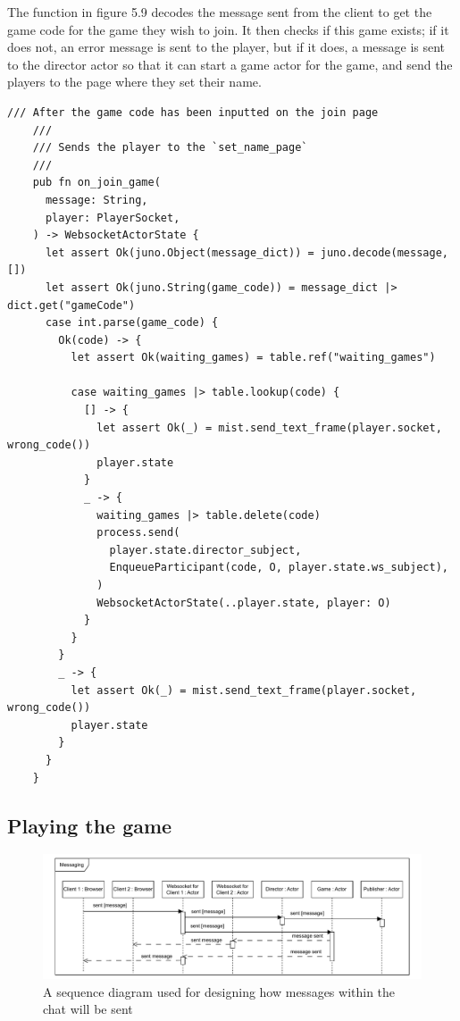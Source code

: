 \documentclass[]{final}
\begin{document}
\newpage

\begin{minipage}[t]{18em}
  The function in figure 5.9 decodes the message sent from the client to
  get the game code for the game they wish to join. It then checks if this game
  exists; if it does not, an error message is sent to the player, but if it does,
  a message is sent to the director actor so that it can start a game actor for the game,
  and send the players to the page where they set their name.
\end{minipage}
\hfill
\begin{minipage}[t]{20em}
  \begin{lstlisting}[language=gleam]
    /// After the game code has been inputted on the join page
    ///
    /// Sends the player to the `set_name_page`
    ///
    pub fn on_join_game(
      message: String,
      player: PlayerSocket,
    ) -> WebsocketActorState {
      let assert Ok(juno.Object(message_dict)) = juno.decode(message, [])
      let assert Ok(juno.String(game_code)) = message_dict |> dict.get("gameCode")
      case int.parse(game_code) {
        Ok(code) -> {
          let assert Ok(waiting_games) = table.ref("waiting_games")

          case waiting_games |> table.lookup(code) {
            [] -> {
              let assert Ok(_) = mist.send_text_frame(player.socket, wrong_code())
              player.state
            }
            _ -> {
              waiting_games |> table.delete(code)
              process.send(
                player.state.director_subject,
                EnqueueParticipant(code, O, player.state.ws_subject),
              )
              WebsocketActorState(..player.state, player: O)
            }
          }
        }
        _ -> {
          let assert Ok(_) = mist.send_text_frame(player.socket, wrong_code())
          player.state
        }
      }
    }
\end{lstlisting}
  \label{fig: 9}
\end{minipage}

\newpage

\subsection{Playing the game}

\begin{figure}[ht!]
  \centering
  \includegraphics[width=0.9\linewidth]{sequence_messaging}
  \caption{A sequence diagram used for designing how messages within the chat will be sent}
  \label{fig: 10}
\end{figure}
\end{document}
